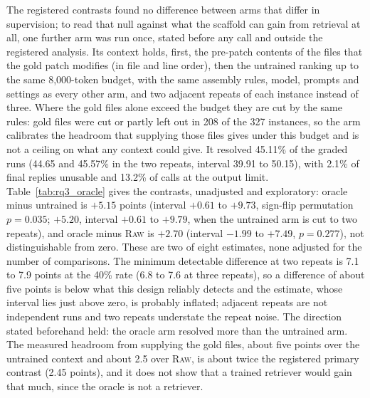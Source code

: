 \documentclass[10pt,twocolumn]{article}
\makeatletter
\renewcommand\paragraph{\@startsection{paragraph}{4}{\z@}{3pt}{-0.5em}{\normalfont\bfseries}}
\makeatother
\begin{document}




\paragraph{Exploratory oracle calibration arm.} The registered contrasts found no difference between arms that differ in supervision; to read that null against what the scaffold can gain from retrieval at all, one further arm was run once, stated before any call and outside the registered analysis. Its context holds, first, the pre-patch contents of the files that the gold patch modifies (in file and line order), then the untrained ranking up to the same 8,000-token budget, with the same assembly rules, model, prompts and settings as every other arm, and two adjacent repeats of each instance instead of three. %
Where the gold files alone exceed the budget they are cut by the same rules: gold files were cut or partly left out in 208 of the 327 instances, so the arm calibrates the headroom that supplying those files gives under this budget and is not a ceiling on what any context could give. %
It resolved 45.11\% of the graded runs (44.65 and 45.57\% in the two repeats, interval 39.91 to 50.15), with 2.1\% of final replies unusable and 13.2\% of calls at the output limit. %
Table~\ref{tab:rq3_oracle} gives the contrasts, unadjusted and exploratory: oracle minus untrained is $+5.15$ points (interval $+0.61$ to $+9.73$, sign-flip permutation $p=0.035$; $+5.20$, interval $+0.61$ to $+9.79$, when the untrained arm is cut to two repeats), and oracle minus \textsc{Raw} is $+2.70$ (interval $-1.99$ to $+7.49$, $p=0.277$), not distinguishable from zero. %
These are two of eight estimates, none adjusted for the number of comparisons. The minimum detectable difference at two repeats is 7.1 to 7.9 points at the 40\% rate (6.8 to 7.6 at three repeats), so a difference of about five points is below what this design reliably detects and the estimate, whose interval lies just above zero, is probably inflated; adjacent repeats are not independent runs and two repeats understate the repeat noise. %
The direction stated beforehand held: the oracle arm resolved more than the untrained arm. The measured headroom from supplying the gold files, about five points over the untrained context and about 2.5 over \textsc{Raw}, is about twice the registered primary contrast (2.45 points), and it does not show that a trained retriever would gain that much, since the oracle is not a retriever. %
\end{document}
